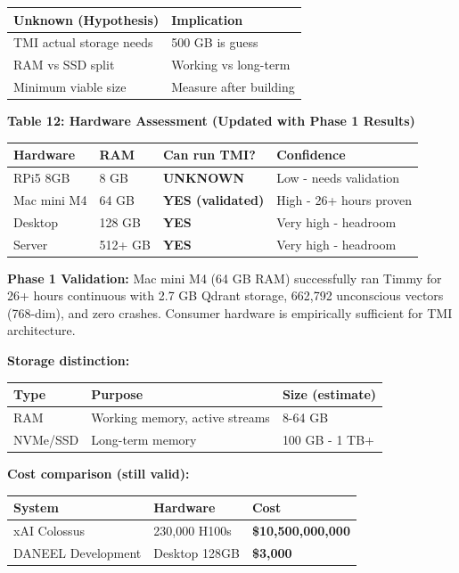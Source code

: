 \documentclass[
  11pt,
]{article}
\newcounter{none} %
\begin{document}
{\def\LTcaptype{none} %
\begin{longtable}[]{@{}ll@{}}
\toprule\noalign{}
Unknown (Hypothesis) & Implication \\
\midrule\noalign{}
\endhead
\bottomrule\noalign{}
\endlastfoot
TMI actual storage needs & 500 GB is guess \\
RAM vs SSD split & Working vs long-term \\
Minimum viable size & Measure after building \\
\end{longtable}
}

\textbf{Table 12: Hardware Assessment (Updated with Phase 1 Results)}

{\def\LTcaptype{none} %
\begin{longtable}[]{@{}llll@{}}
\toprule\noalign{}
Hardware & RAM & Can run TMI? & Confidence \\
\midrule\noalign{}
\endhead
\bottomrule\noalign{}
\endlastfoot
RPi5 8GB & 8 GB & \textbf{UNKNOWN} & Low - needs validation \\
Mac mini M4 & 64 GB & \textbf{YES (validated)} & High - 26+ hours
proven \\
Desktop & 128 GB & \textbf{YES} & Very high - headroom \\
Server & 512+ GB & \textbf{YES} & Very high - headroom \\
\end{longtable}
}

\textbf{Phase 1 Validation:} Mac mini M4 (64 GB RAM) successfully ran
Timmy for 26+ hours continuous with 2.7 GB Qdrant storage, 662,792
unconscious vectors (768-dim), and zero crashes. Consumer hardware is
empirically sufficient for TMI architecture.

\textbf{Storage distinction:}

{\def\LTcaptype{none} %
\begin{longtable}[]{@{}lll@{}}
\toprule\noalign{}
Type & Purpose & Size (estimate) \\
\midrule\noalign{}
\endhead
\bottomrule\noalign{}
\endlastfoot
RAM & Working memory, active streams & 8-64 GB \\
NVMe/SSD & Long-term memory & 100 GB - 1 TB+ \\
\end{longtable}
}

\textbf{Cost comparison (still valid):}

{\def\LTcaptype{none} %
\begin{longtable}[]{@{}lll@{}}
\toprule\noalign{}
System & Hardware & Cost \\
\midrule\noalign{}
\endhead
\bottomrule\noalign{}
\endlastfoot
xAI Colossus & 230,000 H100s & \textbf{\$10,500,000,000} \\
DANEEL Development & Desktop 128GB & \textbf{\$3,000} \\
\end{longtable}
}
\end{document}
